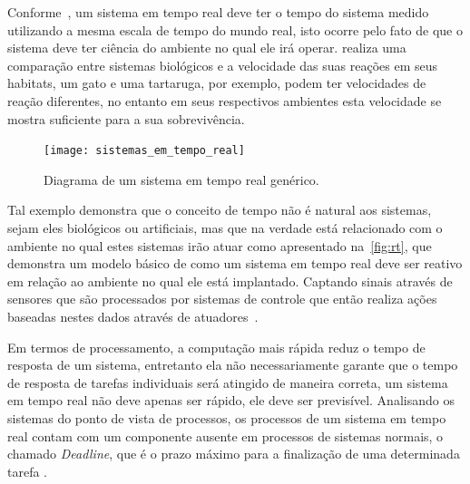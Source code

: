 Conforme~, um sistema em tempo real deve ter o tempo do sistema medido utilizando a mesma escala de tempo do mundo real, isto ocorre pelo fato de que o sistema deve ter ciência do ambiente no qual ele irá operar. 
% 
 realiza uma comparação entre sistemas biológicos e a velocidade das suas reações em seus habitats, um gato e uma tartaruga, por exemplo, podem ter velocidades de reação diferentes, no entanto em seus respectivos ambientes esta velocidade se mostra suficiente para a sua sobrevivência. 

\begin{figure}[ht]
    \caption{Diagrama de um sistema em tempo real genérico.}
	\texttt{[image: sistemas\_em\_tempo\_real]}
    \centering
    \label{fig:rt}
\end{figure}

Tal exemplo demonstra que o conceito de tempo não é natural aos sistemas, sejam eles biológicos ou artificiais, mas que na verdade está relacionado com o ambiente no qual estes sistemas irão atuar como apresentado na~\autoref{fig:rt}, que demonstra um modelo básico de como um sistema em tempo real deve ser reativo em relação ao ambiente no qual ele está implantado. Captando sinais através de sensores que são processados por sistemas de controle que então realiza ações baseadas nestes dados através de atuadores~\cite{BUTTAZZO:2011}.



Em termos de processamento, a computação mais rápida reduz o tempo de resposta de um sistema, entretanto ela não necessariamente garante que o tempo de resposta de tarefas individuais será atingido de maneira correta, um sistema em tempo real não deve apenas ser rápido, ele deve ser previsível. Analisando os sistemas do ponto de vista de processos, os processos de um sistema em tempo real contam com um componente ausente em processos de sistemas normais, o chamado \textit{Deadline}, que é o prazo máximo para a finalização de uma determinada tarefa \cite{BUTTAZZO:2011}.

